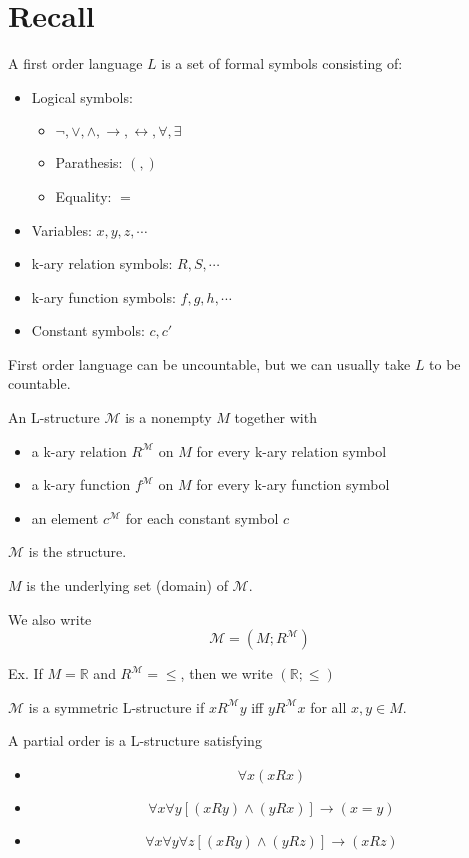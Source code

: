 \documentclass[11pt]{article}
\begin{document}
	\section{Recall}
	A first order language $L$ is a set of formal symbols consisting of:
	\begin{itemize}
		\item Logical symbols: 
		\begin{itemize} 
			\item $\neg, \vee, \wedge, \rightarrow, \leftrightarrow, \forall, \exists$
			\item Parathesis: $(, )$
			\item Equality: $=$
		\end{itemize}
		\item Variables: $x, y, z,\cdots$
		\item k-ary relation symbols: $R, S, \cdots$
		\item k-ary function symbols: $f, g, h, \cdots$
		\item Constant symbols: $c, c'$
	\end{itemize}
	
	First order language can be uncountable, but we can usually take $L$ to be countable.
	
	An L-structure $\mathcal{M}$ is a nonempty $M$ together with 
	\begin{itemize}
		\item a k-ary relation $R^{\mathcal{M}}$ on $M$ for every k-ary relation symbol
		\item a k-ary function $f^{\mathcal{M}}$ on $M$ for every k-ary function symbol
		\item an element $c^{\mathcal{M}}$ for each constant symbol $c$
	\end{itemize}
	
	$\mathcal{M}$ is the structure.
	
	$M$ is the underlying set (domain) of $\mathcal{M}$.
	
	We also write 
	\[\mathcal{M} = (M; R^{\mathcal{M}})\]
	
	Ex. If $M = \mathbb{R}$ and $R^{\mathcal{M}} = \leq$, then we write $(\mathbb{R}; \leq)$
	
	\begin{definition}
		$\mathcal{M}$ is a symmetric L-structure if $xR^{\mathcal{M}}y$ iff $yR^{\mathcal{M}}x$ for all $x, y \in M$.
	\end{definition}
	
	\begin{definition}
		A partial order is a L-structure satisfying
		\begin{itemize}
			\item \[\forall x (xRx)\]
			\item \[\forall x \forall y [ (xRy) \wedge (yRx)] \rightarrow (x = y)\]
			\item \[\forall x \forall y \forall z [(xRy) \wedge (yRz)] \rightarrow (xRz)\]
		\end{itemize}
	\end{definition}
	
\end{document}
